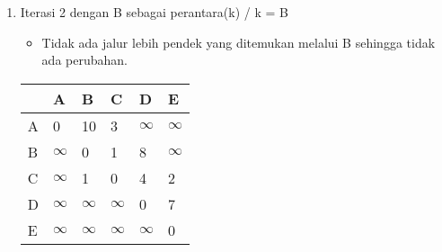 \begin{enumerate}
    \item Iterasi 2 dengan B sebagai perantara(k) / k = B
    \begin{itemize}
        \item Tidak ada jalur lebih pendek yang ditemukan melalui B sehingga tidak ada perubahan.
    \end{itemize}
    \begin{table}[h]
        \begin{tabular}{|l|l|l|l|l|l|}
        \hline
          & A        & B        & C        & D        & E        \\ \hline
        A & 0        & 10       & 3        & $\infty$ & $\infty$ \\ \hline
        B & $\infty$ & 0        & 1        & 8        & $\infty$ \\ \hline
        C & $\infty$ & 1        & 0        & 4        & 2        \\ \hline
        D & $\infty$ & $\infty$ & $\infty$ & 0        & 7        \\ \hline
        E & $\infty$ & $\infty$ & $\infty$ & $\infty$ & 0        \\ \hline
        \end{tabular}
    \end{table}


\end{enumerate}

